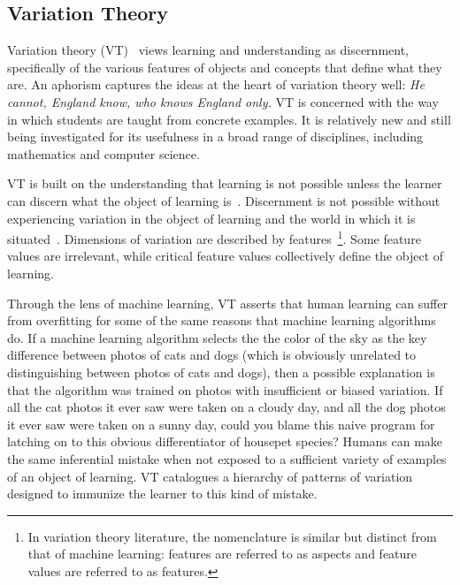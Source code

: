 \subsection{Variation Theory}

Variation theory (VT)~\cite{marton1997learning} views learning and understanding as discernment, specifically of the various features of objects and concepts that define what they are. An aphorism captures the ideas at the heart of variation theory well: {\it He cannot, England know, who knows England only.} VT is concerned with the way in which students are taught from concrete examples. It is relatively new and still being investigated for its usefulness in a broad range of disciplines, including mathematics and computer science.%

VT is built on the understanding that learning is not possible unless the learner can discern what the object of learning is~\cite{marton1997learning}. Discernment is not possible without experiencing variation in the object of learning and the world in which it is situated~\cite{marton2004classroom}. Dimensions of variation are described by features~\cite{ling2012variation}\footnote{In variation theory literature, the nomenclature is similar but distinct from that of machine learning: features are referred to as aspects and feature values are referred to as features.}. Some feature values are irrelevant, while critical feature values collectively define the object of learning.

Through the lens of machine learning, VT asserts that human learning can suffer from overfitting for some of the same reasons that machine learning algorithms do. If a machine learning algorithm selects the the color of the sky as the key difference between photos of cats and dogs (which is obviously unrelated to distinguishing between photos of cats and dogs), then a possible explanation is that the algorithm was trained on photos with insufficient or biased variation. If all the cat photos it ever saw were taken on a cloudy day, and all the dog photos it ever saw were taken on a sunny day, could you blame this naive program for latching on to this obvious differentiator of housepet species? Humans can make the same inferential mistake when not exposed to a sufficient variety of examples of an object of learning. VT catalogues a hierarchy of patterns of variation designed to immunize the learner to this kind of mistake.


